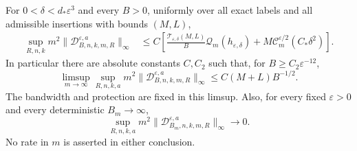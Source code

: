 \begin{theorem}
\label{thm:v46-protected-correction}
For $0<\delta<d_*\varepsilon^3$ and every $B>0$, uniformly over all
exact labels and all admissible insertions with bounds $(M,L)$,
\begin{align}
 \sup_{R,n,k}m^2
       \|\mathscr D^{\varepsilon,a}_{B,n,k,m,R}\|_\infty
 &\le C\left[
 \frac{\mathcal T_{\varepsilon,\delta}(M,L)}{B}
                        \mathcal Q_m(h_{\varepsilon,\delta})
          +M\mathcal C_m^{\varepsilon/2}(C_*\delta^2)\right].
                                      \label{eq:v46-finite-time-bound}
\end{align}
In particular there are absolute constants $C,C_2$ such that, for
$B\ge C_2\varepsilon^{-12}$,
\begin{equation}\label{eq:v46-bandwidth-modulus}
 \limsup_{m\to\infty}\sup_{R,n,k,a}m^2
       \|\mathscr D^{\varepsilon,a}_{B,n,k,m,R}\|_\infty
                    \le C(M+L)B^{-1/2}.
\end{equation}
The bandwidth and protection are fixed in this limsup. Also, for every
fixed $\varepsilon>0$ and every deterministic $B_m\to\infty$,
\begin{equation}\label{eq:v46-growing-band-protected}
 \sup_{R,n,k,a}m^2
       \|\mathscr D^{\varepsilon,a}_{B_m,n,k,m,R}\|_\infty
                                  \longrightarrow0.
\end{equation}
No rate in $m$ is asserted in either conclusion.
\end{theorem}
